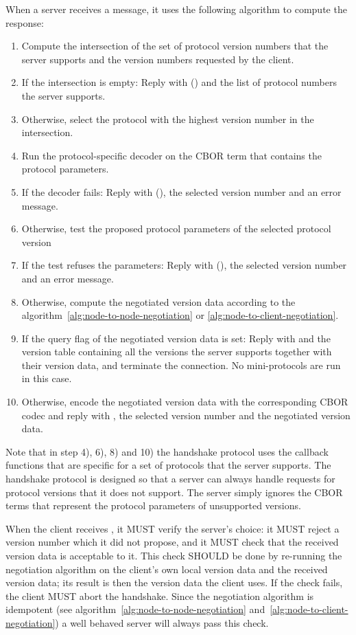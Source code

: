When a server receives a \MsgProposeVersions{} message, it uses the following algorithm to
compute the response:
\begin{enumerate}
\item
  Compute the intersection of the set of protocol version numbers that the server supports
  and the version numbers requested by the client.
\item
  If the intersection is empty:
  Reply with \MsgRefuse(\VersionMismatch) and the list of protocol numbers the server supports.
\item
  Otherwise, select the protocol with the highest version number in the
    intersection.
\item
  Run the protocol-specific decoder on the CBOR term that contains the protocol parameters.
\item
  If the decoder fails:
  Reply with \MsgRefuse(\HandshakeDecodeError), the selected version number and an error message.
\item
  Otherwise, test the proposed protocol parameters of the selected protocol version
\item
  If the test refuses the parameters:
    Reply with \MsgRefuse(\Refused), the selected version number and an error message.
\item
  Otherwise, compute the negotiated version data according to the
    algorithm~\ref{alg:node-to-node-negotiation} or
    \ref{alg:node-to-client-negotiation}.
\item
  If the query flag of the negotiated version data is set:
  Reply with \MsgQueryReply{} and the version table containing all the
  versions the server supports together with their version data, and terminate
  the connection.  No mini-protocols are run in this case.
\item
  Otherwise, encode the negotiated version data with the corresponding CBOR
    codec and reply with \MsgAcceptVersion, the selected version number
    and the negotiated version data.
\end{enumerate}
Note that in step 4), 6), 8) and 10) the handshake protocol uses the callback
functions that are specific for a set of protocols that the server supports.
The handshake protocol is designed
so that a server can always handle requests for protocol versions that it does not support.
The server simply ignores the CBOR terms that represent the protocol parameters of unsupported
versions.

When the client receives \MsgAcceptVersion{}, it MUST verify the server's
choice: it MUST reject a version number which it did not propose, and it MUST
check that the received version data is acceptable to it.  This check SHOULD
be done by re-running the negotiation algorithm on the client's own local
version data and the received version data; its result is then the version
data the client uses.  If the check fails, the client MUST abort the
handshake.  Since the negotiation algorithm is idempotent (see
algorithm~\ref{alg:node-to-node-negotiation}
and~\ref{alg:node-to-client-negotiation}) a well behaved server will always
pass this check.

